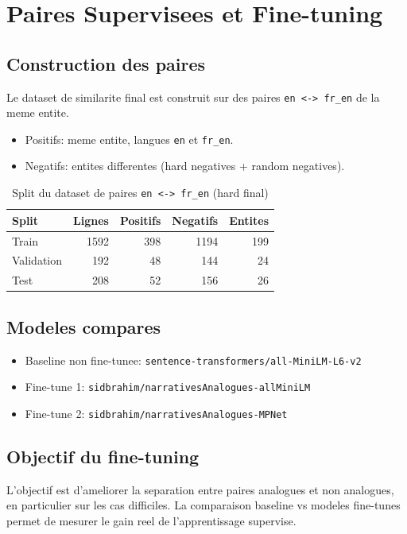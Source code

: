 ﻿\chapter{Paires Supervisees et Fine-tuning}

\section{Construction des paires}
Le dataset de similarite final est construit sur des paires
\texttt{en <-> fr\_en} de la meme entite.
\begin{itemize}[leftmargin=2em]
  \item Positifs: meme entite, langues \texttt{en} et \texttt{fr\_en}.
  \item Negatifs: entites differentes (hard negatives + random negatives).
\end{itemize}

\begin{table}[H]
  \centering
  \caption{Split du dataset de paires \texttt{en <-> fr\_en} (hard final)}
  \begin{tabular}{lrrrr}
    \toprule
    Split & Lignes & Positifs & Negatifs & Entites \\
    \midrule
    Train & 1592 & 398 & 1194 & 199 \\
    Validation & 192 & 48 & 144 & 24 \\
    Test & 208 & 52 & 156 & 26 \\
    \bottomrule
  \end{tabular}
\end{table}

\section{Modeles compares}
\begin{itemize}[leftmargin=2em]
  \item Baseline non fine-tunee: \texttt{sentence-transformers/all-MiniLM-L6-v2}
  \item Fine-tune 1: \texttt{sidbrahim/narrativesAnalogues-allMiniLM}
  \item Fine-tune 2: \texttt{sidbrahim/narrativesAnalogues-MPNet}
\end{itemize}

\section{Objectif du fine-tuning}
L'objectif est d'ameliorer la separation entre paires analogues et non analogues,
en particulier sur les cas difficiles. La comparaison baseline vs modeles
fine-tunes permet de mesurer le gain reel de l'apprentissage supervise.
